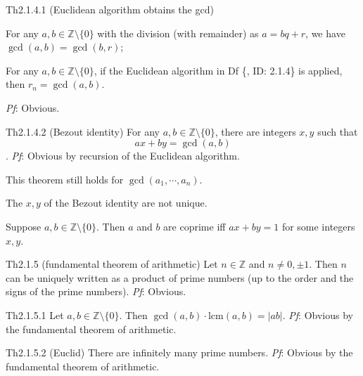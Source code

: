 \documentclass{article}
\newcommand{\lcm}{\text{lcm}}
\begin{document}
\begin{Th}{Th2.1.4.1 (Euclidean algorithm obtains the gcd)}
    \begin{compactenum}
        \item For any $a, b\in\mathbb{Z}\setminus \{0\}$ with the division (with remainder) as $a = bq + r$, we have $\gcd(a, b) = \gcd(b, r)$;
        \item For any $a, b\in\mathbb{Z}\setminus \{0\}$, if the Euclidean algorithm in Df \{, ID: 2.1.4\} is applied, then $r_n = \gcd(a, b)$.
    \end{compactenum}
    \tcblower
    \textit{Pf}: Obvious.
\end{Th}

\begin{Th}{Th2.1.4.2 (Bezout identity)}
    For any $a, b\in\mathbb{Z}\setminus \{0\}$, there are integers $x, y$ such that
    $$ ax + by = \gcd(a, b) $$.
    \tcblower
    \textit{Pf}: Obvious by recursion of the Euclidean algorithm.
\end{Th}

\begin{Rmk}{}
    \begin{compactenum}
        \item \textcolor{Th}{This theorem still holds for $\gcd(a_1, \cdots, a_n)$.}
        \item \textcolor{Th}{The $x, y$ of the Bezout identity are not unique.}
        \item \textcolor{Th}{Suppose $a, b\in\mathbb{Z}\setminus \{0\}$. Then $a$ and $b$ are coprime iff $ax + by = 1$ for some integers $x, y$.}
    \end{compactenum}
\end{Rmk}

\begin{Th}{Th2.1.5 (fundamental theorem of arithmetic)}
    Let $n\in\mathbb{Z}$ and $n\neq 0, \pm 1$. Then $n$ can be uniquely written as a product of prime numbers (up to the order and the signs of the prime numbers).
    \tcblower
    \textit{Pf}: Obvious.
\end{Th}

\begin{Th}{Th2.1.5.1}
    Let $a, b\in\mathbb{Z}\setminus \{0\}$. Then $\gcd(a, b)\cdot \lcm(a, b) = |ab|$.
    \tcblower
    \textit{Pf}: Obvious by the fundamental theorem of arithmetic.
\end{Th}

\begin{Th}{Th2.1.5.2 (Euclid)}
    There are infinitely many prime numbers.
    \tcblower
    \textit{Pf}: Obvious by the fundamental theorem of arithmetic.
\end{Th}
\end{document}
